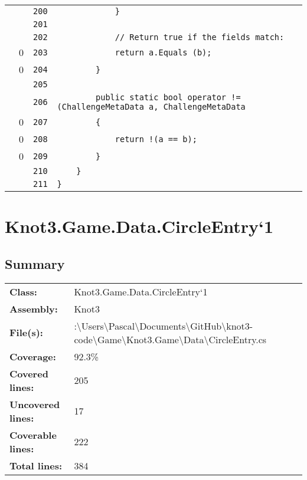 \documentclass[a4paper,10pt]{article}
\begin{document}
\begin{longtable}[l]{lrrl}
\cellcolor{gray} &  & \verb~200~ & \verb~            }~\\
\cellcolor{gray} &  & \verb~201~ & \verb~~\\
\cellcolor{gray} &  & \verb~202~ & \verb~            // Return true if the fields match:~\\
\cellcolor{red} & 0 & \verb~203~ & \verb~            return a.Equals (b);~\\
\cellcolor{red} & 0 & \verb~204~ & \verb~        }~\\
\cellcolor{gray} &  & \verb~205~ & \verb~~\\
\cellcolor{gray} &  & \verb~206~ & \verb~        public static bool operator != (ChallengeMetaData a, ChallengeMetaData~\\
\cellcolor{red} & 0 & \verb~207~ & \verb~        {~\\
\cellcolor{red} & 0 & \verb~208~ & \verb~            return !(a == b);~\\
\cellcolor{red} & 0 & \verb~209~ & \verb~        }~\\
\cellcolor{gray} &  & \verb~210~ & \verb~    }~\\
\cellcolor{gray} &  & \verb~211~ & \verb~}~\\
\end{longtable}
\newpage
\section{Knot3.Game.Data.CircleEntry`1}
\subsection{Summary}
\begin{longtable}[l]{ll}
\textbf{Class:} & Knot3.Game.Data.CircleEntry`1\\
\textbf{Assembly:} & Knot3\\
\textbf{File(s):} & \begin{minipage}[t]{12cm}{:\textbackslash Users\textbackslash Pascal\textbackslash Documents\textbackslash GitHub\textbackslash knot3-code\textbackslash Game\textbackslash Knot3.Game\textbackslash Data\textbackslash CircleEntry.cs}\end{minipage} \\
\textbf{Coverage:} & 92.3\%\\
\textbf{Covered lines:} & 205\\
\textbf{Uncovered lines:} & 17\\
\textbf{Coverable lines:} & 222\\
\textbf{Total lines:} & 384\\
\end{longtable}
\end{document}
